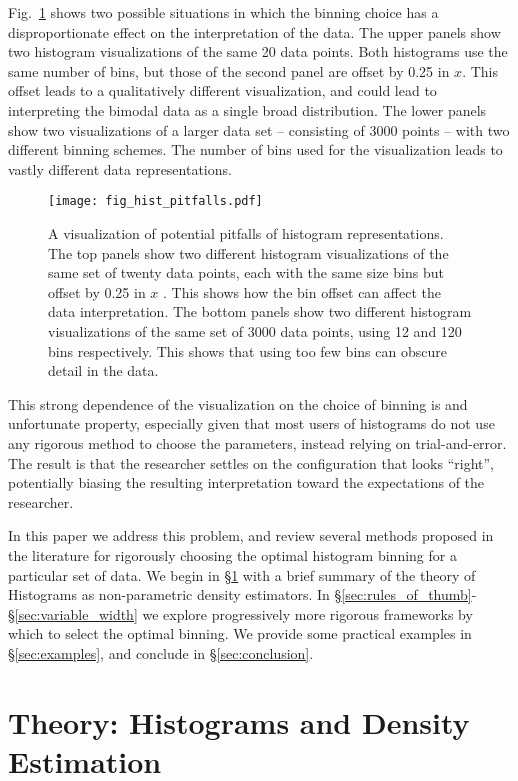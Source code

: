\documentclass[12pt]{article}
\newcommand{\fig}[1]{Fig.~\ref{fig:#1}}
\newcommand{\sect}[1]{\S\ref{sec:#1}}
\begin{document}
\fig{hist_pitfalls} shows two possible situations in which the binning choice
has a disproportionate effect on the interpretation of the data.  The upper
panels show two histogram visualizations of the same 20 data points.  Both
histograms use the same number of bins, but those of the second panel are
offset by 0.25 in $x$.  This offset leads to a qualitatively different
visualization, and could lead to interpreting the bimodal data as a single
broad distribution.  The lower panels show two visualizations of a larger
data set -- consisting of 3000 points -- with two different binning schemes.
The number of bins used for the visualization leads to vastly different
data representations.

\begin{figure}
  \centering
  \texttt{[image: fig\_hist\_pitfalls.pdf]}
  \label{fig:hist_pitfalls}
  \caption{A visualization of potential pitfalls of histogram representations.
    The top panels show two different histogram visualizations of the same
    set of twenty data points, each with the same size bins but offset by
    0.25 in $x$ \citep[adapted from][]{Ivezic2013}.
    This shows how the bin offset can affect the data interpretation.
    The bottom panels show two different histogram visualizations of the
    same set of 3000 data points, using 12 and 120 bins respectively.
    This shows that using too few bins can obscure detail in the data.}
\end{figure}

This strong dependence of the visualization on the choice of binning is
and unfortunate property, especially given that most users of histograms
do not use any rigorous method to choose the parameters, instead relying
on trial-and-error.  The result is that the researcher settles
on the configuration that looks ``right'', potentially biasing
the resulting interpretation toward the expectations of the researcher.

In this paper we address this problem, and review several methods proposed
in the literature for rigorously choosing the optimal histogram binning for
a particular set of data.  We begin in \sect{theory} with a brief summary
of the theory of Histograms as non-parametric density estimators.  In
\sect{rules_of_thumb}-\sect{variable_width} we explore
progressively more rigorous frameworks by which to select the optimal
binning.  We provide some practical examples in \sect{examples}, and
conclude in \sect{conclusion}.


\section{Theory: Histograms and Density Estimation}
\label{sec:theory}
\end{document}
